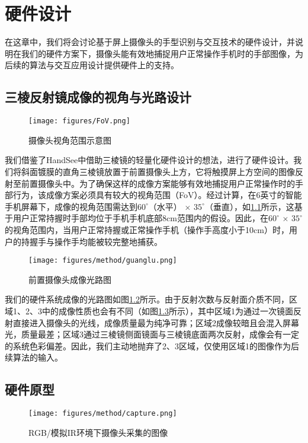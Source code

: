 \chapter{硬件设计}

在这章中，我们将会讨论基于屏上摄像头的手型识别与交互技术的硬件设计，并说明在我们的硬件方案下，摄像头能有效地捕捉用户正常操作手机时的手部图像，为后续的算法与交互应用设计提供硬件上的支持。

\section{三棱反射镜成像的视角与光路设计}

\begin{figure}
\centering
\texttt{[image: figures/FoV.png]}
\caption{摄像头视角范围示意图}
\label{fig:FoV}
\end{figure}

我们借鉴了HandSee\cite{Yu:2019:HEF:3290605.3300935}中借助三棱镜的轻量化硬件设计的想法，进行了硬件设计。我们将斜面镀膜的直角三棱镜放置于前置摄像头上方，它将触摸屏上方空间的图像反射至前置摄像头中。为了确保这样的成像方案能够有效地捕捉用户正常操作时的手部行为，该成像方案必须具有较大的视角范围（FoV）。经过计算，在6英寸的智能手机屏幕下，成像的视角范围需达到$60^{\circ}$（水平） $\times$ $35^{\circ}$（垂直），如\ref{fig:FoV}所示，这基于用户正常持握时手部均位于手机手机底部8cm范围内的假设。因此，在$60^{\circ}$ $\times$ $35^{\circ}$的视角范围内，当用户正常持握或正常操作手机（操作手高度小于10cm）时，用户的持握手与操作手均能被较完整地捕获。

\begin{figure}
\centering
\texttt{[image: figures/method/guanglu.png]}
\caption{前置摄像头成像光路图}
\label{fig:guanglu}
\end{figure}


我们的硬件系统成像的光路图如图\ref{fig:guanglu}所示。由于反射次数与反射面介质不同，区域1、2、3中的成像性质也会有不同（如图\ref{fig:capture}所示），其中区域1为通过一次镜面反射直接进入摄像头的光线，成像质量最为纯净可靠；区域2成像较暗且会混入屏幕光，质量最差；区域3通过三棱镜侧面镜面与三棱镜底面两次反射，成像会有一定的系统色彩偏差。因此，我们主动地抛弃了2、3区域，仅使用区域1的图像作为后续算法的输入。



\section{硬件原型}

\begin{figure}
\centering
\texttt{[image: figures/method/capture.png]}
\caption{RGB/模拟IR环境下摄像头采集的图像}
\label{fig:capture}
\end{figure}

